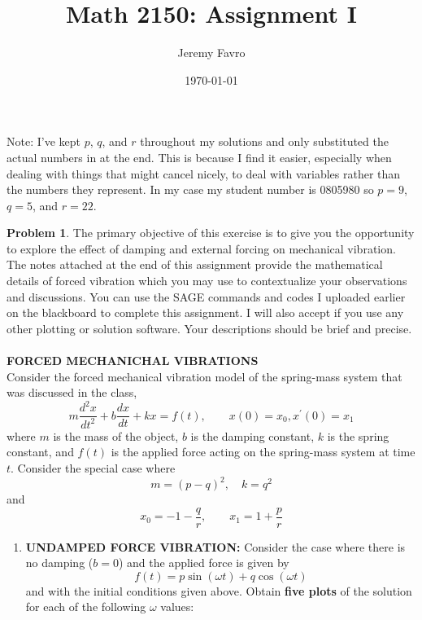 \documentclass[10pt]{article}
\title{Math 2150: Assignment I}
\author{Jeremy Favro}
\date{\today}
\theoremstyle{definition}
\newtheorem{problem}{Problem}
\begin{document}
\maketitle
\noindent Note: I've kept $p$, $q$, and $r$ throughout my solutions and only substituted the actual numbers in at the end. This is because I find it easier,
especially when dealing with things that might cancel nicely, to deal with variables rather than the numbers they represent. In my case my
student number is 0805980 so $p=9$, $q=5$, and $r=22$.
\\
\begin{problem}
The primary objective of this exercise is to give you the opportunity to explore the effect
of damping and external forcing on mechanical vibration. The notes attached at the end of
this assignment provide the mathematical details of forced vibration which you may use to
contextualize your observations and discussions. You can use the SAGE commands and codes
I uploaded earlier on the blackboard to complete this assignment. I will also accept if you
use any other plotting or solution software. Your descriptions should be brief and precise. \\\\
\textbf{FORCED MECHANICHAL VIBRATIONS}
\\
Consider the forced mechanical vibration model of the spring-mass system that was discussed in the class,
\begin{equation}
  m\frac{d^2x}{dt^2}+b\frac{dx}{dt}+kx=f(t), \qquad x(0)=x_0, x^\prime(0)=x_1
\end{equation}
where $m$ is the mass of the object, $b$ is the damping constant, $k$ is the spring constant, and $f(t)$ is the applied
force acting on the spring-mass system at time $t$. Consider the special case where
\begin{equation}
  m=(p-q)^2,\quad k=q^2
\end{equation}
and
\begin{equation*}
  x_0=-1-\frac{q}{r}, \qquad x_1=1+\frac{p}{r}
\end{equation*}
\begin{enumerate}[label=(\alph*)]
  \item \textbf{UNDAMPED FORCE VIBRATION:} Consider the case where there is no damping ($b = 0$) and the applied force is given by
        \begin{equation}
          f(t)=p\sin\left(\omega t\right)+q\cos\left(\omega t\right)
        \end{equation}
        and with the initial conditions given above. Obtain \textbf{five plots} of the solution for each of the following $\omega$ values:

\end{enumerate}
\end{problem}
\end{document}
